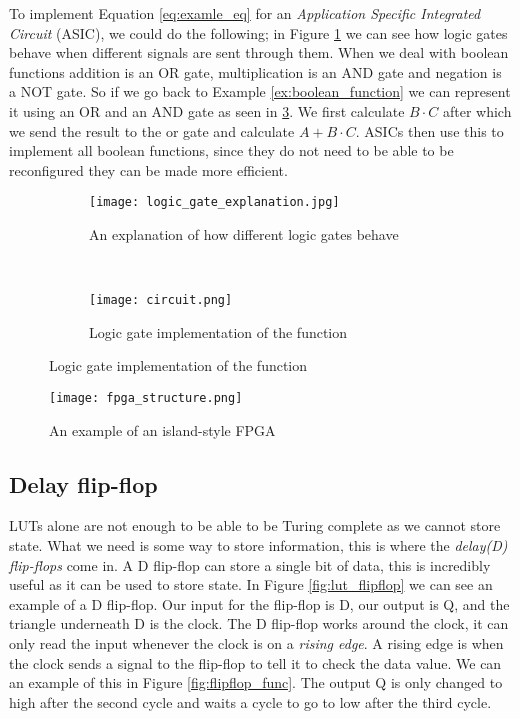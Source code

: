 To implement Equation \ref{eq:examle_eq} for an \textit{Application Specific Integrated
Circuit} (ASIC), we could do the following; in Figure
\ref{fig:logic_gate_explanation} we can see how logic gates behave when
different signals are sent through them. When we deal with boolean functions
addition is an OR gate, multiplication is an AND gate and negation is a NOT
gate. So if we go back to Example \ref{ex:boolean_function} we can represent it
using an OR and an AND gate as seen in \ref{fig:logic_gate_impl}. We first
calculate $B \cdot C$ after which we send the result to the or gate and
calculate $A + B \cdot C$. ASICs then use this to implement all boolean
functions, since they do not need to be able to be reconfigured they can be
made more efficient.

\begin{figure}[H]
    \centering
    \begin{subfigure}[b]{.4\textwidth}
        \centering
        \texttt{[image: logic\_gate\_explanation.jpg]}
        \caption{An explanation of how different logic gates behave\citep{LogicGateBehavior}}
        \label{fig:logic_gate_explanation}
    \end{subfigure}
    ~
    \begin{subfigure}[b]{.4\textwidth}
        \centering
        \texttt{[image: circuit.png]}
        \caption{Logic gate implementation of the function}
        \label{fig:logic_gate_impl}
    \end{subfigure}
\end{figure}

\begin{figure}[H]
    \centering
    \texttt{[image: fpga\_structure.png]}
    \caption{An example of an island-style FPGA\citep{M.MorrisMano3}}
    \label{fig:fpga_structure}
\end{figure}

\subsection{Delay flip-flop}
LUTs alone are not enough to be able to be Turing complete as we cannot store
state. What we need is some way to store information, this is where the
\textit{delay(D) flip-flops} come in. A D flip-flop can store a single bit of
data, this is incredibly useful as it can be used to store state. In Figure
\ref{fig:lut_flipflop} we can see an example of a D flip-flop. Our input for
the flip-flop is D, our output is Q, and the triangle underneath D is the
clock. The D flip-flop works around the clock, it can only read the input
whenever the clock is on a \textit{rising edge}. A rising edge is when the
clock sends a signal to the flip-flop to tell it to check the data value. We
can an example of this in Figure \ref{fig:flipflop_func}. The output Q is only
changed to high after the second cycle and waits a cycle to go to low after the
third cycle.


